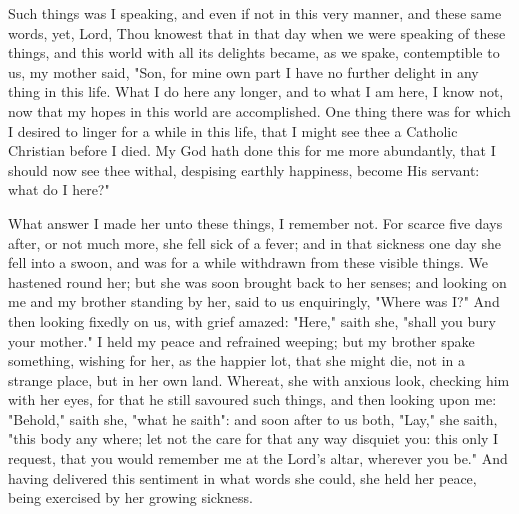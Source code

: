 \documentclass[b5paper,openright,12pt,twoside]{book}
\begin{document}
Such things was I speaking, and even if not in this very manner, and
these same words, yet, Lord, Thou knowest that in that day when we were
speaking of these things, and this world with all its delights became,
as we spake, contemptible to us, my mother said, "Son, for mine own part
I have no further delight in any thing in this life. What I do here any
longer, and to what I am here, I know not, now that my hopes in this
world are accomplished. One thing there was for which I desired to
linger for a while in this life, that I might see thee a Catholic
Christian before I died. My God hath done this for me more abundantly,
that I should now see thee withal, despising earthly happiness, become
His servant: what do I here?"

What answer I made her unto these things, I remember not. For scarce
five days after, or not much more, she fell sick of a fever; and in that
sickness one day she fell into a swoon, and was for a while withdrawn
from these visible things. We hastened round her; but she was soon
brought back to her senses; and looking on me and my brother standing by
her, said to us enquiringly, "Where was I?" And then looking fixedly on
us, with grief amazed: "Here," saith she, "shall you bury your mother."
I held my peace and refrained weeping; but my brother spake something,
wishing for her, as the happier lot, that she might die, not in a
strange place, but in her own land. Whereat, she with anxious look,
checking him with her eyes, for that he still savoured such things, and
then looking upon me: "Behold," saith she, "what he saith": and soon
after to us both, "Lay," she saith, "this body any where; let not the
care for that any way disquiet you: this only I request, that you would
remember me at the Lord's altar, wherever you be." And having delivered
this sentiment in what words she could, she held her peace, being
exercised by her growing sickness.
\end{document}
